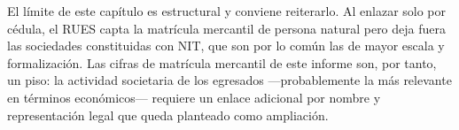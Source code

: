 \noindent El límite de este capítulo es estructural y conviene reiterarlo. Al enlazar solo por cédula, el RUES capta la matrícula mercantil de persona natural pero deja fuera las sociedades constituidas con NIT, que son por lo común las de mayor escala y formalización. Las cifras de matrícula mercantil de este informe son, por tanto, un piso: la actividad societaria de los egresados ---probablemente la más relevante en términos económicos--- requiere un enlace adicional por nombre y representación legal que queda planteado como ampliación.
